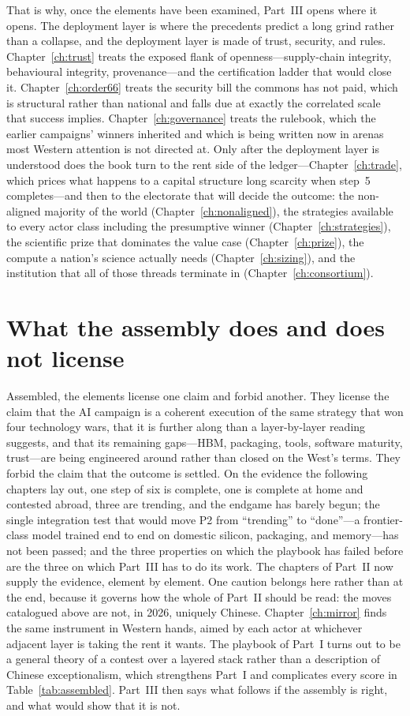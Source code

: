 That is why, once the elements have been examined, Part~III opens where it opens. The deployment layer is where the precedents predict a long grind rather than a collapse, and the deployment layer is made of trust, security, and rules. Chapter~\ref{ch:trust} treats the exposed flank of openness---supply-chain integrity, behavioural integrity, provenance---and the certification ladder that would close it. Chapter~\ref{ch:order66} treats the security bill the commons has not paid, which is structural rather than national and falls due at exactly the correlated scale that success implies. Chapter~\ref{ch:governance} treats the rulebook, which the earlier campaigns' winners inherited and which is being written now in arenas most Western attention is not directed at. Only after the deployment layer is understood does the book turn to the rent side of the ledger---Chapter~\ref{ch:trade}, which prices what happens to a capital structure long scarcity when step~5 completes---and then to the electorate that will decide the outcome: the non-aligned majority of the world (Chapter~\ref{ch:nonaligned}), the strategies available to every actor class including the presumptive winner (Chapter~\ref{ch:strategies}), the scientific prize that dominates the value case (Chapter~\ref{ch:prize}), the compute a nation's science actually needs (Chapter~\ref{ch:sizing}), and the institution that all of those threads terminate in (Chapter~\ref{ch:consortium}).

\section{What the assembly does and does not license}

Assembled, the elements license one claim and forbid another. They license the claim that the AI campaign is a coherent execution of the same strategy that won four technology wars, that it is further along than a layer-by-layer reading suggests, and that its remaining gaps---HBM, packaging, tools, software maturity, trust---are being engineered around rather than closed on the West's terms. They forbid the claim that the outcome is settled. On the evidence the following chapters lay out, one step of six is complete, one is complete at home and contested abroad, three are trending, and the endgame has barely begun; the single integration test that would move P2 from ``trending'' to ``done''---a frontier-class model trained end to end on domestic silicon, packaging, and memory---has not been passed; and the three properties on which the playbook has failed before are the three on which Part~III has to do its work. The chapters of Part~II now supply the evidence, element by element. One caution belongs here rather than at the end, because it governs how the whole of Part~II should be read: the moves catalogued above are not, in 2026, uniquely Chinese. Chapter~\ref{ch:mirror} finds the same instrument in Western hands, aimed by each actor at whichever adjacent layer is taking the rent it wants. The playbook of Part~I turns out to be a general theory of a contest over a layered stack rather than a description of Chinese exceptionalism, which strengthens Part~I and complicates every score in Table~\ref{tab:assembled}. Part~III then says what follows if the assembly is right, and what would show that it is not.
